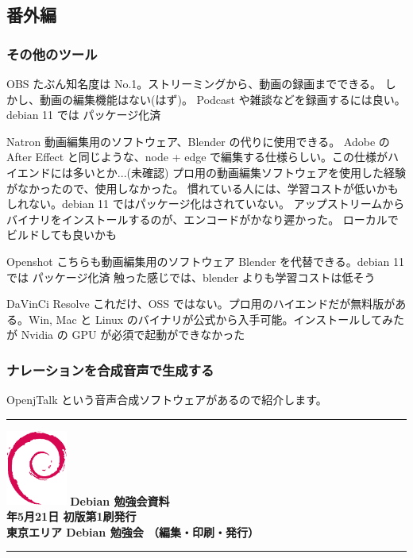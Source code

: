 \documentclass[mingoth,a4paper]{jsarticle}
\newcommand{\debmtgyear}{2022}
\newcommand{\debmtgmonth}{5}
\newcommand{\debmtgdate}{21}
\begin{document}
%
%
%
%
\subsection{番外編}
\subsubsection{その他のツール}
\begin{description}
\item{OBS}
たぶん知名度は No.1。ストリーミングから、動画の録画までできる。
しかし、動画の編集機能はない(はず)。
Podcast や雑談などを録画するには良い。debian 11 では パッケージ化済

\item{Natron}
動画編集用のソフトウェア、Blender の代りに使用できる。
Adobe の After Effect と同じような、node + edge で編集する仕様らしい。この仕様がハイエンドには多いとか...(未確認)
プロ用の動画編集ソフトウェアを使用した経験がなかったので、使用しなかった。
慣れている人には、学習コストが低いかもしれない。debian 11 ではパッケージ化はされていない。
アップストリームからバイナリをインストールするのが、エンコードがかなり遲かった。
ローカルでビルドしても良いかも

\item{Openshot}
こちらも動画編集用のソフトウェア Blender を代替できる。debian 11 では パッケージ化済
触った感じでは、blender よりも学習コストは低そう

\item{DaVinCi Resolve}
これだけ、OSS ではない。プロ用のハイエンドだが無料版がある。Win, Mac と Linux のバイナリが公式から入手可能。インストールしてみたが Nvidia の GPU が必須で起動ができなかった
  
\end{description}
\subsubsection{ナレーションを合成音声で生成する}
OpenjTalk という音声合成ソフトウェアがあるので紹介します。


\vspace*{15cm}
\hrule
\vspace{2mm}
\includegraphics[width=2cm]{image-assets/openlogo-nd.eps}
\noindent \Large \bf Debian 勉強会資料\\
\noindent \normalfont \debmtgyear{}年\debmtgmonth{}月\debmtgdate{}日 \hspace{5mm}  初版第1刷発行\\
\noindent \normalfont 東京エリア Debian 勉強会 （編集・印刷・発行）\\
\hrule
\end{document}
